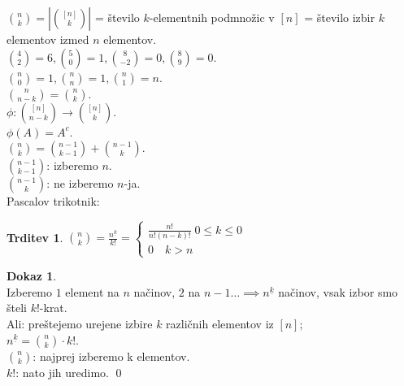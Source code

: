 \documentclass[a4paper, 12pt]{book}
\theoremstyle{definition}
\newtheorem{claim}[counter]{Trditev}
\newtheorem{pro}[counter]{Dokaz}
\theoremstyle{remark}
\begin{document}
$\binom{n}{k} = \left|\binom{[n]}{k}\right|$ = število $k$-elementnih podmnožic v $[n]$
= število izbir $k$ elementov izmed $n$ elementov. \\
$\binom{4}{2} = 6, \binom{5}{0} = 1, \binom{8}{-2} = 0, \binom{8}{9} = 0$. \\
$\binom{n}{0} = 1, \binom{n}{n} = 1, \binom{n}{1} = n$. \\
$\binom{n}{n-k} = \binom{n}{k}$. \\
$\phi: \binom{[n]}{n-k} \to \binom{[n]}{k}$. \\
$\phi(A) = A^c$. \\
$\binom{n}{k} = \binom{n-1}{k-1} + \binom{n-1}{k}$. \\
$\binom{n-1}{k-1}$: izberemo $n$. \\
$\binom{n-1}{k}$: ne izberemo $n$-ja. \\
Pascalov trikotnik: \\
\begin{claim}
  $\binom{n}{k} = \frac{n^{\underline{k}}}{k!} = \begin{cases}
    \frac{n!}{n! (n-k)!} \; 0 \leq k \leq 0 \\
    0 \quad k > n
  \end{cases}$
\end{claim}
\begin{pro} \text{} \\
  Izberemo $1$ element na $n$ načinov, $2$ na $n-1 \dots \implies n^{\underline{k}}$ načinov,
  vsak izbor smo šteli $k!$-krat. \\
  Ali: preštejemo urejene izbire $k$ različnih elementov iz $[n]$; \\
  $n^{\underline{k}} = \binom{n}{k} \cdot k!$. \\
  $\binom{n}{k}$: najprej izberemo k elementov. \\
  $k!$: nato jih uredimo.
  \qed
\end{pro}
\end{document}
